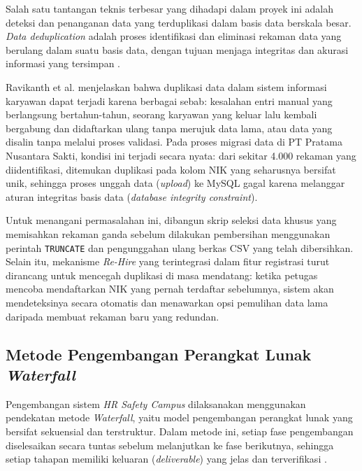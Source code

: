 Salah satu tantangan teknis terbesar yang dihadapi dalam proyek ini adalah
deteksi dan penanganan data yang terduplikasi dalam basis data berskala besar.
\textit{Data deduplication} adalah proses identifikasi dan eliminasi rekaman
data yang berulang dalam suatu basis data, dengan tujuan menjaga integritas dan
akurasi informasi yang tersimpan \cite{ravikanth2024deduplication}.

Ravikanth et al. \cite{ravikanth2024deduplication} menjelaskan bahwa duplikasi
data dalam sistem informasi karyawan dapat terjadi karena berbagai sebab: kesalahan
entri manual yang berlangsung bertahun-tahun, seorang karyawan yang keluar lalu
kembali bergabung dan didaftarkan ulang tanpa merujuk data lama, atau data yang
disalin tanpa melalui proses validasi. Pada proses migrasi data di PT Pratama
Nusantara Sakti, kondisi ini terjadi secara nyata: dari sekitar 4.000 rekaman
yang diidentifikasi, ditemukan duplikasi pada kolom NIK yang seharusnya bersifat
unik, sehingga proses unggah data (\textit{upload}) ke MySQL gagal karena
melanggar aturan integritas basis data (\textit{database integrity constraint}).

Untuk menangani permasalahan ini, dibangun skrip seleksi data khusus yang
memisahkan rekaman ganda sebelum dilakukan pembersihan menggunakan perintah
\texttt{TRUNCATE} dan pengunggahan ulang berkas CSV yang telah dibersihkan.
Selain itu, mekanisme \textit{Re-Hire} yang terintegrasi dalam fitur registrasi
turut dirancang untuk mencegah duplikasi di masa mendatang: ketika petugas
mencoba mendaftarkan NIK yang pernah terdaftar sebelumnya, sistem akan
mendeteksinya secara otomatis dan menawarkan opsi pemulihan data lama daripada
membuat rekaman baru yang redundan.

\subsection{Metode Pengembangan Perangkat Lunak \textit{Waterfall}}

Pengembangan sistem \textit{HR Safety Campus} dilaksanakan menggunakan pendekatan
metode \textit{Waterfall}, yaitu model pengembangan perangkat lunak yang bersifat
sekuensial dan terstruktur. Dalam metode ini, setiap fase pengembangan diselesaikan
secara tuntas sebelum melanjutkan ke fase berikutnya, sehingga setiap tahapan
memiliki keluaran (\textit{deliverable}) yang jelas dan terverifikasi
\cite{ardiyanto2023waterfall}.

